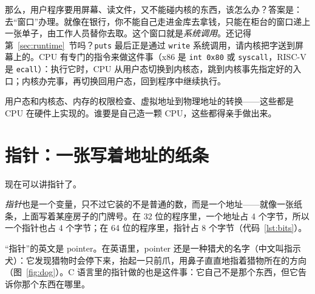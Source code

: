 那么，用户程序要用屏幕、读文件，又不能碰内核的东西，该怎么办？答案是：去“窗口”办理。就像在银行，你不能自己走进金库去拿钱，只能在柜台的窗口递上一张单子，由工作人员替你去取。这个窗口就是\emph{系统调用}。还记得第~\ref{sec:runtime}~节吗？\texttt{puts} 最后正是通过 \texttt{write} 系统调用，请内核把字送到屏幕上的。CPU 有专门的指令来做这件事（x86 是 \texttt{int 0x80} 或 \texttt{syscall}，RISC-V 是 \texttt{ecall}）：执行它时，CPU 从用户态切换到内核态，跳到内核事先指定好的入口；内核办完事，再切换回用户态，回到程序中继续执行。

用户态和内核态、内存的权限检查、虚拟地址到物理地址的转换——这些都是 CPU 在硬件上实现的。谁要是自己造一颗 CPU，这些都得亲手做出来。

\section{指针：一张写着地址的纸条}
\label{sec:pointer}

现在可以讲指针了。

\emph{指针}也是一个变量，只不过它装的不是普通的数，而是一个地址——就像一张纸条，上面写着某座房子的门牌号。在 32 位的程序里，一个地址占 4 个字节，所以一个指针也占 4 个字节；在 64 位的程序里，指针占 8 个字节（代码~\ref{lst:bits}）。

“指针”的英文是 pointer。在英语里，pointer 还是一种猎犬的名字（中文叫指示犬）：它发现猎物时会停下来，抬起一只前爪，用鼻子直直地指着猎物所在的方向（图~\ref{fig:dog}）。C 语言里的指针做的也是这件事：它自己不是那个东西，但它告诉你那个东西在哪里。

